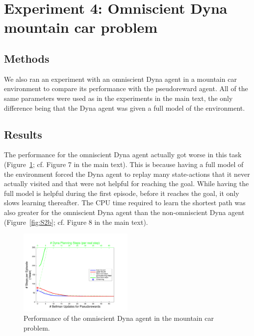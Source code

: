 \documentclass[letterpaper]{article}
\begin{document}
\section{Experiment 4: Omniscient Dyna mountain car problem}

\subsection{Methods}

We also ran an experiment with an omniscient Dyna agent in a mountain car environment to compare its performance with the pseudoreward agent. All of the same parameters were used as in the experiments in the main text, the only difference being that the Dyna agent was given a full model of the environment.

\subsection{Results}

The performance for the omniscient Dyna agent actually got worse in this task (Figure~\ref{fig:S2a}; cf. Figure 7 in the main text). This is because having a full model of the environment forced the Dyna agent to replay many state-actions that it never actually visited and that were not helpful for reaching the goal. While having the full model is helpful during the first episode, before it reaches the goal, it only slows learning thereafter. The CPU time required to learn the shortest path was also greater for the omniscient Dyna agent than the non-omniscient Dyna agent (Figure~\ref{fig:S2b}; cf. Figure 8 in the main text).

\begin{figure}[ht]
\centering
\includegraphics[width=0.5\textwidth]{MC_learning_vs_PRiterations_omniscientDYNA_mean}
\caption{Performance of the omniscient Dyna agent in the mountain car problem.}
\label{fig:S2a}
\end{figure}
\end{document}
